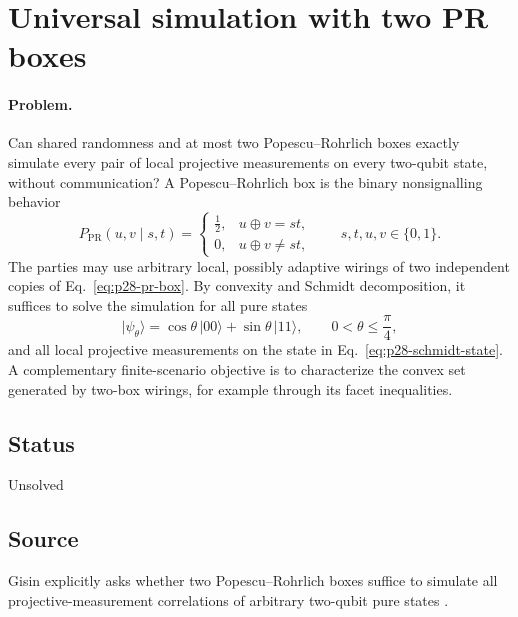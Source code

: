\section{Universal simulation with two PR boxes}
\label{sec:problem-28}

\paragraph{Problem.}
Can shared randomness and at most two Popescu--Rohrlich boxes exactly simulate
every pair of local projective measurements on every two-qubit state, without
communication?  A Popescu--Rohrlich box is the binary nonsignalling behavior
\begin{equation}
  P_{\mathrm{PR}}(u,v\mid s,t)
  =\begin{cases}
     \tfrac12,&u\oplus v=st,\\
     0,&u\oplus v\neq st,
   \end{cases}
  \qquad s,t,u,v\in\{0,1\}.
  \label{eq:p28-pr-box}
\end{equation}
The parties may use arbitrary local, possibly adaptive wirings of two
independent copies of Eq.~\eqref{eq:p28-pr-box}.  By convexity and Schmidt
decomposition, it suffices to solve the simulation for all pure states
\begin{equation}
  \lvert\psi_\theta\rangle
  =\cos\theta\,\lvert00\rangle+\sin\theta\,\lvert11\rangle,
  \qquad 0<\theta\leq\frac{\pi}{4},
  \label{eq:p28-schmidt-state}
\end{equation}
and all local projective measurements on the state in
Eq.~\eqref{eq:p28-schmidt-state}.  A complementary finite-scenario objective
is to characterize the convex set generated by two-box wirings, for example
through its facet inequalities.

\subsection*{Status}

Unsolved

\subsection*{Source}

Gisin explicitly asks whether two Popescu--Rohrlich boxes suffice to simulate
all projective-measurement correlations of arbitrary two-qubit pure states
.

